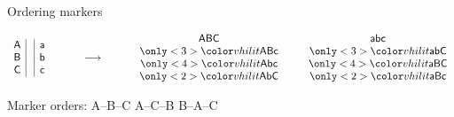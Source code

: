 \documentclass[aspectratio=169,12pt,t]{beamer}
\begin{document}
\begin{frame}{Ordering markers}

\vspace{5mm}

$$
\begin{array}{c|} \mathsf{A} \\ \mathsf{B} \\ \mathsf{C} \end{array}
\left. \enspace
\begin{array}{|c} \mathsf{a} \\ \mathsf{b} \\ \mathsf{c} \end{array}
\right.
\hspace*{1cm} \longrightarrow \hspace*{1cm}
\begin{array}{ccc} \mathsf{ABC} & \hspace*{3mm} & \mathsf{abc} \\
\only<3>{\vhilit} \mathsf{ABc} & \hspace*{3mm} & \only<3>{\vhilit} \mathsf{abC} \\
\only<4>{\vhilit} \mathsf{Abc} & \hspace*{3mm} & \only<4>{\vhilit} \mathsf{aBC} \\
\only<2>{\vhilit} \mathsf{AbC} & \hspace*{3mm} & \only<2>{\vhilit}\mathsf{aBc} \end{array}
$$

\vspace{5mm}
\begin{center}

{\hilit Marker orders: \hspace{5mm}
{ \only<2>{ \vhilit } A--B--C } \hspace{5mm} { 
  A--C--B } \hspace{5mm} {  B--A--C }}

\vspace{15mm}


\end{center}

\end{frame}
\end{document}
